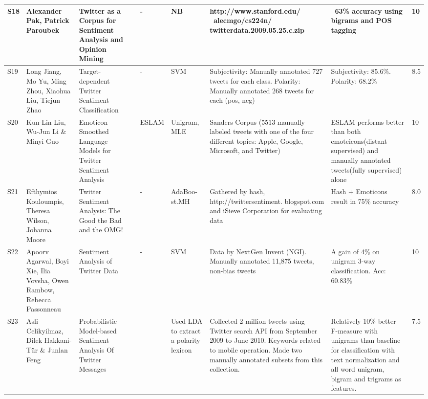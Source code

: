 \begin{landscape}
\begin{supertabular}{|P{0.5cm}|P{2.8cm}|P{3.5cm}|P{0.6cm}|P{1cm}|P{1cm}|P{3.3cm}|P{3cm}|P{0.5cm}|}
		S18 & Alexander Pak, Patrick Paroubek & Twitter as a Corpus for Sentiment Analysis and Opinion Mining & \citeyear{article:pak} & - & NB & http://www.stanford.edu/  ~alecmgo/cs224n/ twitterdata.2009.05.25.c.zip & ~63\% accuracy using bigrams and POS tagging & 10 \\ \hline 
		
		S19 & Long Jiang, Mo Yu, Ming Zhou, Xiaohua Liu, Tiejun Zhao & Target-dependent Twitter Sentiment Classification & \citeyear{article:jiang} & - & SVM & Subjectivity: Manually annotated 727 tweets for each class. Polarity: Manually annotated 268 tweets for each (pos, neg) & Subjectivity: 85.6\%. Polarity: 68.2\% & 8.5 \\ \hline  
		    
		S20 & Kun-Lin Liu, Wu-Jun Li \& Minyi Guo & Emoticon Smoothed Language Models for Twitter Sentiment Analysis & \citeyear{liu2012emoticon} & ESLAM & Unigram, MLE & Sanders Corpus (5513 manually labeled tweets with one of the four different topics: Apple, Google, Microsoft, and Twitter) & ESLAM performs better than both emoteicons(distant supervised) and manually annotated tweets(fully supervised) alone & 10 \\
		
		S21 & Efthymios Kouloumpis, Theresa Wilson, Johanna Moore & Twitter Sentiment Analysis: The Good the Bad and the OMG! & \citeyear{article:omg} & - & AdaBoo-st.MH & Gathered by hash, http://twittersentiment. blogspot.com and iSieve Corporation for evaluating data & Hash + Emoticons result in 75\% accuracy & 8.0 \\ \hline  
		
		S22 & Apoorv Agarwal, Boyi Xie, Ilia Vovsha, Owen Rambow, Rebecca Passonneau & Sentiment Analysis of Twitter Data & \citeyear{vovsha2011sentiment} & - & SVM & Data by NextGen Invent (NGI). Manually annotated 11,875 tweets, non-bias tweets & A gain of 4\% on unigram 3-way classification. Acc: 60.83\% & 10 \\ \hline  
		
		S23 & Asli Celikyilmaz, Dilek Hakkani-T\"{u}r \& Junlan Feng  & Probabilistic Model-based Sentiment Analysis Of Twitter Messages & \citeyear{celikyilmaz2010probabilistic} &  & Used LDA to extract a polarity lexicon & Collected 2 million tweets using Twitter search API from September 2009 to June 2010. Keywords related to mobile operation. Made two manually annotated subsets from this collection. & Relatively 10\% better F-measure with unigrams than baseline for classification with text normalization and all word unigram, bigram and trigrams as features. & 7.5 \\
		
	\end{supertabular}
\end{landscape}